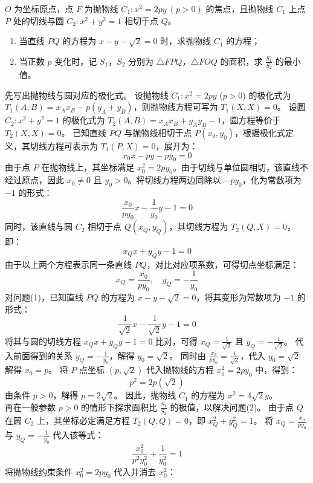 \begin{example}
\(O\) 为坐标原点，点 \(F\) 为抛物线 \(C_1: x^2 = 2py\ (p>0)\) 的焦点，且抛物线 \(C_1\) 上点 \(P\) 处的切线与圆 \(C_2: x^2 + y^2 = 1\) 相切于点 \(Q\)。
\begin{enumerate}
    \item[(1)] 当直线 \(PQ\) 的方程为 \(x - y - \sqrt{2} = 0\) 时，求抛物线 \(C_1\) 的方程；
    \item[(2)] 当正数 \(p\) 变化时，记 \(S_1\)，\(S_2\) 分别为 \(\triangle FPQ\)，\(\triangle FOQ\) 的面积，求 \(\frac{S_1}{S_2}\) 的最小值。
\end{enumerate}
\end{example}
\begin{solution}
先写出抛物线与圆对应的极化式。
设抛物线 $C_1: x^2 = 2py$ ($p > 0$) 的极化式为 $T_1(A, B) = x_A x_B - p(y_A + y_B)$，则抛物线方程可写为 $T_1(X, X) = 0$。
设圆 $C_2: x^2 + y^2 = 1$ 的极化式为 $T_2(A, B) = x_A x_B + y_A y_B - 1$，圆方程等价于 $T_2(X, X) = 0$。
已知直线 $PQ$ 与抛物线相切于点 $P(x_0, y_0)$，根据极化式定义，其切线方程可表示为 $T_1(P, X) = 0$，展开为：
\[ x_0 x - p y - p y_0 = 0 \]
由于点 $P$ 在抛物线上，其坐标满足 $x_0^2 = 2py_0$。由于切线与单位圆相切，该直线不经过原点，因此 $x_0 \neq 0$ 且 $y_0 > 0$。将切线方程两边同除以 $-p y_0$，化为常数项为 $-1$ 的形式：
\[ \frac{x_0}{p y_0}x - \frac{1}{y_0}y - 1 = 0 \]
同时，该直线与圆 $C_2$ 相切于点 $Q(x_Q, y_Q)$，其切线方程为 $T_2(Q, X) = 0$，即：
\[ x_Q x + y_Q y - 1 = 0 \]
由于以上两个方程表示同一条直线 $PQ$，对比对应项系数，可得切点坐标满足：
\[ x_Q = \frac{x_0}{p y_0}, \quad y_Q = -\frac{1}{y_0} \]
对问题(1)，已知直线 $PQ$ 的方程为 $x - y - \sqrt{2} = 0$，将其变形为常数项为 $-1$ 的形式：
\[ \frac{1}{\sqrt{2}}x - \frac{1}{\sqrt{2}}y - 1 = 0 \]
将其与圆的切线方程 $x_Q x + y_Q y - 1 = 0$ 比对，可得 $x_Q = \frac{1}{\sqrt{2}}$ 且 $y_Q = -\frac{1}{\sqrt{2}}$。
代入前面得到的关系 $y_Q = -\frac{1}{y_0}$，解得 $y_0 = \sqrt{2}$。
同时由 $\frac{x_0}{p y_0} = \frac{1}{\sqrt{2}}$，代入 $y_0 = \sqrt{2}$ 解得 $x_0 = p$。
将 $P$ 点坐标 $(p, \sqrt{2})$ 代入抛物线的方程 $x_0^2 = 2py_0$ 中，得到：
\[ p^2 = 2p(\sqrt{2}) \]
由条件 $p > 0$，解得 $p = 2\sqrt{2}$。
因此，抛物线 $C_1$ 的方程为 $x^2 = 4\sqrt{2}y$。\\
再在一般参数 $p > 0$ 的情形下探求面积比 $\frac{S_1}{S_2}$ 的极值，以解决问题(2)。
由于点 $Q$ 在圆 $C_2$ 上，其坐标必定满足方程 $T_2(Q, Q) = 0$，即 $x_Q^2 + y_Q^2 = 1$。
将 $x_Q = \frac{x_0}{p y_0}$ 与 $y_Q = -\frac{1}{y_0}$ 代入该等式：
\[ \frac{x_0^2}{p^2 y_0^2} + \frac{1}{y_0^2} = 1 \]
将抛物线约束条件 $x_0^2 = 2py_0$ 代入并消去 $x_0^2$：

\end{solution}
